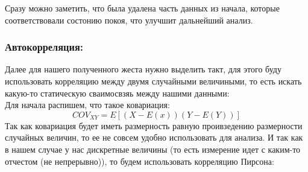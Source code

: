 \begin{figure}[H]
\end{figure}

Сразу можно заметить, что была удалена часть данных из начала, которые соответствовали состонию покоя, что улучшит дальнейший анализ.

\subsubsection{Автокорреляция:}
Далее для нашего полученного жеста нужно выделить такт, для этого буду использовать корреляцию между двумя случайными величиными, то есть искать какую-то статическую сваимосвзяь между нашими данными: \\
Для начала распишем, что такое ковариация:
\[COV_{XY} = E\left[ (X - E(x)) (Y - E(Y))\right]\]
Так как ковариация будет иметь размерность равную проивзедению размерности случайных величин, то ее не совсем удобно использовать для анализа. И так как в нашем случае у нас дискретные величины (то есть измерение идет с каким-то отчестом (не непрерывно)), то будем использовать корреляцию Пирсона:

